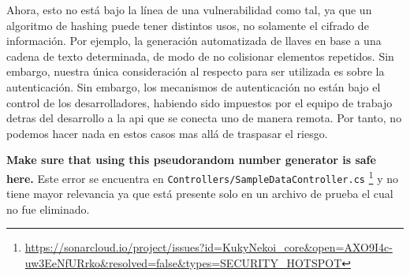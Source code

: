 Ahora, esto no está bajo la línea de una vulnerabilidad como tal, ya que un algoritmo de hashing puede tener distintos usos, no solamente el cifrado de información. Por ejemplo, la generación automatizada de llaves en base a una cadena de texto determinada, de modo de no colisionar elementos repetidos. Sin embargo, nuestra única consideración al respecto para ser utilizada es sobre la autenticación. Sin embargo, los mecanismos de autenticación no están bajo el control de los desarrolladores, habiendo sido impuestos por el equipo de trabajo detras del desarrollo a la api que se conecta uno de manera remota. Por tanto, no podemos hacer nada en estos casos mas allá de traspasar el riesgo.

\textbf{Make sure that using this pseudorandom number generator is safe here.} Este error se encuentra en \texttt{Controllers/SampleDataController.cs} \footnote{\url{https://sonarcloud.io/project/issues?id=KukyNekoi_core&open=AXO9I4c-uw3EeNfURrko&resolved=false&types=SECURITY_HOTSPOT}} y no tiene mayor relevancia ya que está presente solo en un archivo de prueba el cual no fue eliminado.
